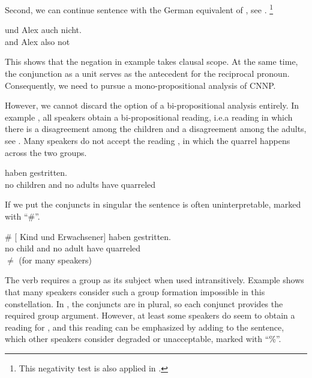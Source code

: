 \documentclass[output=paper]{langsci/langscibook}
\begin{document}
Second, we can continue sentence  with the German equivalent of , see .%
\footnote{This negativity test is also applied in \citet{Zeijlstra:17}.}

\ea \label{ex-refl-neither}
\gll {} und Alex auch nicht.\\
{} and Alex also not\\
\glt {}
\z 

This shows that the negation in example  takes clausal scope. At the same time, the conjunction as a unit serves as the antecedent for the reciprocal pronoun. Consequently, we need to pursue a mono-propositional analysis of CNNP. 

However, we cannot discard the option of a bi-propositional analysis entirely. 
In example , all speakers obtain a bi-propositional reading, i.e.\@ a reading in which there is a disagreement among the children and a disagreement among the adults, see .
Many speakers do not accept the reading , in which the quarrel happens across the two groups.


\ea \label{ex-eltern}
 haben gestritten.\\
\hphantom{[}no children and no adults have quarreled\\
\glt {}
\begin{xlist}
\end{xlist}
\z

\begin{sloppypar}
  If we put the conjuncts in singular the sentence is often
  uninterpretable, marked with ``\#''.
\end{sloppypar}

\ea \label{ex-eltern2}
\gll \# [ Kind und  Erwachsener] haben gestritten.\\
{} \hphantom{[}no child and no adult have quarreled\\
\glt $\not=$  (for many speakers)
\z

The verb  requires a group as its subject when used intransitively. 
Example  shows that many speakers consider such a group formation impossible in this constellation. 
In , the conjuncts are in plural, so each conjunct provides the required group argument. However, at least some speakers do seem to obtain a reading for , and this reading can be emphasized by adding  to the sentence, which other speakers consider degraded or unacceptable, marked with ``\%''.
\end{document}
